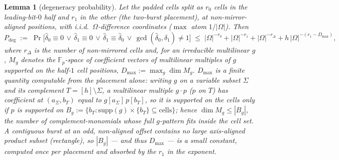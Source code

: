 \documentclass{article}
\newcommand{\Fp}{\mathbb{F}_p}
\newtheorem{lemma}[theorem]{Lemma}
\theoremstyle{definition}
\begin{document}
\begin{lemma}[degeneracy probability]\label{lem:degprob}
Let the padded cells split as $r_0$ cells in the leading-bit-$0$ half and $r_1$ in the other (the two-burst placement), at non-mirror-aligned positions, with i.i.d.\ $\Omega$-difference coordinates ($\max$ atom $1/|\Omega|$). Then
\[
P_{\mathrm{deg}} \;:=\; \Pr\big[\hat\delta_0 \equiv 0 \,\vee\, \hat\delta_1 \equiv 0 \,\vee\, \hat\delta_1 \equiv \hat\delta_0 \,\vee\, \gcd(\hat\delta_0, \hat\delta_1) \neq 1\big] \;\leq\; |\Omega|^{-r_0} + |\Omega|^{-r_1} + |\Omega|^{-r_\Delta} + h\, |\Omega|^{-(r_1 - D_{\max})} ,
\]
where $r_\Delta$ is the number of non-mirrored cells and, for an irreducible multilinear $g$, $M_g$ denotes the $\Fp$-space of coefficient vectors of multilinear multiples of $g$ supported on the half-$1$ cell positions, $D_{\max} := \max_g \dim M_g$. $D_{\max}$ is a finite quantity computable from the placement alone: writing $g$ on a variable subset $\Sigma$ and its complement $T = [h]\setminus\Sigma$, a multilinear multiple $g \cdot p$ ($p$ on $T$) has coefficient at $(a_\Sigma, b_T)$ equal to $g[a_\Sigma]\,p[b_T]$, so it is supported on the cells only if $p$ is supported on $B_g := \{b_T : \mathrm{supp}(g) \times \{b_T\} \subseteq \text{cells}\}$; hence $\dim M_g \leq |B_g|$, the number of complement-monomials whose full $g$-pattern fits inside the cell set. A contiguous burst at an \emph{odd, non-aligned} offset contains no large axis-aligned product subset (rectangle), so $|B_g|$ --- and thus $D_{\max}$ --- is a small constant, computed once per placement and absorbed by the $r_1$ in the exponent.
\end{lemma}
\end{document}
